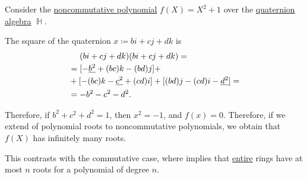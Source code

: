 \begin{example}\label{ex:quaternion_polynomial_with_infinitely_many_roots}
  Consider the \hyperref[def:noncommutative_polynomial_algebra]{noncommutative polynomial} \( f(X) = X^2 + 1 \) over the \hyperref[def:quaternion_algebra]{quaternion algebra} \( \BbbH \).

  The square of the quaternion \( x \coloneqq bi + cj + dk \) is
  \begin{align*}
    &\phantom{{}={}}
    (bi + cj + dk) (bi + cj + dk)
    = \\ &=
    [-\hi{b^2} + (bc)k - (bd)j]
    + \\ &+
    [-(bc)k - \hi{c^2} + (cd)i]
    +
    [(bd)j - (cd)i - \hi{d^2}]
    = \\ &=
    -b^2 - c^2 - d^2.
  \end{align*}

  Therefore, if \( b^2 + c^2 + d^2 = 1 \), then \( x^2 = -1 \), and \( f(x) = 0 \). Therefore, if we extend  of polynomial roots to noncommutative polynomials, we obtain that \( f(X) \) has infinitely many roots.

  This contrasts with the commutative case, where  implies that \hyperref[def:entire_semiring]{entire} rings have at most \( n \) roots for a polynomial of degree \( n \).
\end{example}
